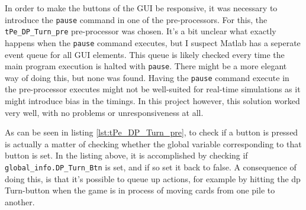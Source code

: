 \documentclass[runningheads,a4paper]{llncs}
\newcommand{\GPenSIM}{../GPenSIM}
\begin{document}
In order to make the buttons of the GUI be responsive, it was necessary to introduce the \verb!pause! command in one of the pre-processors. For this, the \verb!tPe_DP_Turn_pre! pre-processor was chosen. It's a bit unclear what exactly happens when the \verb!pause! command executes, but I suspect Matlab has a seperate event queue for all GUI elements. This queue is likely checked every time the main program execution is halted with \verb!pause!. There might be a more elegant way of doing this, but none was found. Having the \verb!pause! command execute in the pre-processor executes might not be well-suited for real-time simulations as it might introduce bias in the timings. In this project however, this solution worked very well, with no problems or unresponsiveness at all.


As can be seen in listing \ref{lst:tPe_DP_Turn_pre}, to check if a button is pressed is actually a matter of checking whether the global variable corresponding to that button is set. In the listing above, it is accomplished by checking if \verb!global_info.DP_Turn_Btn! is set, and if so set it back to false. A consequence of doing this, is that it's possible to queue up actions, for example by hitting the \ac{dp} Turn-button when the game is in process of moving cards from one pile to another. \\
\end{document}
